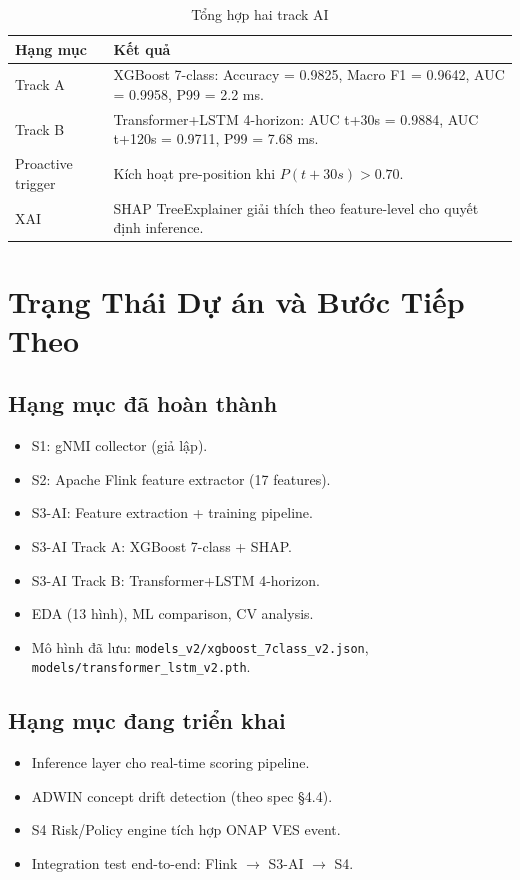 \documentclass[12pt,a4paper]{article}
\begin{document}
\begin{table}[H]
\centering
\caption{Tổng hợp hai track AI}
\begin{tabular}{p{2.5cm} p{11.5cm}}
\toprule
\textbf{Hạng mục} & \textbf{Kết quả} \\
\midrule
Track A & XGBoost 7-class: Accuracy = 0.9825, Macro F1 = 0.9642, AUC = 0.9958, P99 = 2.2 ms. \\
Track B & Transformer+LSTM 4-horizon: AUC t+30s = 0.9884, AUC t+120s = 0.9711, P99 = 7.68 ms. \\
Proactive trigger & Kích hoạt pre-position khi $P(t+30s) > 0.70$. \\
XAI & SHAP TreeExplainer giải thích theo feature-level cho quyết định inference. \\
\bottomrule
\end{tabular}
\end{table}

\section{Trạng Thái Dự án và Bước Tiếp Theo}

\subsection{Hạng mục đã hoàn thành}
\begin{itemize}[leftmargin=2em]
\item S1: gNMI collector (giả lập).
\item S2: Apache Flink feature extractor (17 features).
\item S3-AI: Feature extraction + training pipeline.
\item S3-AI Track A: XGBoost 7-class + SHAP.
\item S3-AI Track B: Transformer+LSTM 4-horizon.
\item EDA (13 hình), ML comparison, CV analysis.
\item Mô hình đã lưu: \texttt{models\_v2/xgboost\_7class\_v2.json}, \texttt{models/transformer\_lstm\_v2.pth}.
\end{itemize}

\subsection{Hạng mục đang triển khai}
\begin{itemize}[leftmargin=2em]
\item Inference layer cho real-time scoring pipeline.
\item ADWIN concept drift detection (theo spec \S4.4).
\item S4 Risk/Policy engine tích hợp ONAP VES event.
\item Integration test end-to-end: Flink $\rightarrow$ S3-AI $\rightarrow$ S4.
\end{itemize}
\end{document}
